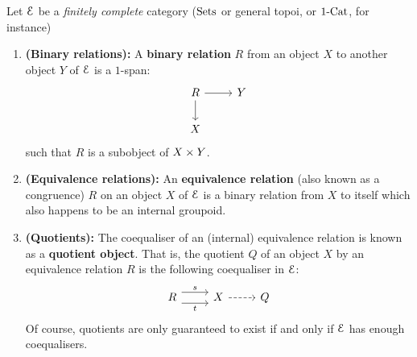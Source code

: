             \begin{definition} \label{def: equivalence_relations}
                Let $\mathcal{E}$ be a \textit{finitely complete} category ($\mathrm{Sets}$ or general topoi, or $1\text{-}\mathrm{Cat}$, for instance)
                    \begin{enumerate}
                        \item \textbf{(Binary relations):} A \textbf{binary relation} $R$ from an object $X$ to another object $Y$ of $\mathcal{E}$ is a $1$-span:
                            $$
                                \begin{tikzcd}
                                	R & Y \\
                                	X
                                	\arrow[from=1-1, to=2-1]
                                	\arrow[from=1-1, to=1-2]
                                \end{tikzcd}
                            $$
                        such that $R$ is a subobject of $X \x Y$. 
                        \item \textbf{(Equivalence relations):} An \textbf{equivalence relation} (also known as a congruence) $R$ on an object $X$ of $\mathcal{E}$ is a binary relation from $X$ to itself which also happens to be an internal groupoid. 
                        \item \textbf{(Quotients):} The coequaliser of an (internal) equivalence relation is known as a \textbf{quotient object}. That is, the quotient $Q$ of an object $X$ by an equivalence relation $R$ is the following coequaliser in $\mathcal{E}$:
                            $$
                                \begin{tikzcd}
                                	R & X & Q
                                	\arrow["s", shift left=2, from=1-1, to=1-2]
                                	\arrow["t"', shift right=2, from=1-1, to=1-2]
                                	\arrow[dashed, from=1-2, to=1-3]
                                \end{tikzcd}
                            $$
                        Of course, quotients are only guaranteed to exist if and only if $\mathcal{E}$ has enough coequalisers. 
                    \end{enumerate}
            \end{definition}
            
